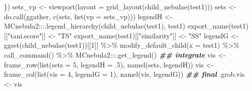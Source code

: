 \documentclass[
]{article}
\newenvironment{Shaded}{\begin{snugshade}}{\end{snugshade}}
\newcommand{\AttributeTok}[1]{\textcolor[rgb]{0.77,0.63,0.00}{#1}}
\newcommand{\DecValTok}[1]{\textcolor[rgb]{0.00,0.00,0.81}{#1}}
\newcommand{\DocumentationTok}[1]{\textcolor[rgb]{0.56,0.35,0.01}{\textbf{\textit{#1}}}}
\newcommand{\FunctionTok}[1]{\textcolor[rgb]{0.00,0.00,0.00}{#1}}
\newcommand{\NormalTok}[1]{#1}
\newcommand{\OtherTok}[1]{\textcolor[rgb]{0.56,0.35,0.01}{#1}}
\newcommand{\SpecialCharTok}[1]{\textcolor[rgb]{0.00,0.00,0.00}{#1}}
\newcommand{\StringTok}[1]{\textcolor[rgb]{0.31,0.60,0.02}{#1}}
\begin{document}
\begin{Shaded}
\begin{Highlighting}[]
\NormalTok{               \})}
\NormalTok{sets\_vp }\OtherTok{\textless{}{-}} \FunctionTok{viewport}\NormalTok{(}\AttributeTok{layout =} \FunctionTok{grid\_layout}\NormalTok{(}\FunctionTok{child\_nebulae}\NormalTok{(test1)))}
\NormalTok{sets }\OtherTok{\textless{}{-}} \FunctionTok{do.call}\NormalTok{(ggather, }\FunctionTok{c}\NormalTok{(sets, }\FunctionTok{list}\NormalTok{(}\AttributeTok{vp =}\NormalTok{ sets\_vp)))}
\NormalTok{legendH }\OtherTok{\textless{}{-}}\NormalTok{ MCnebula2}\SpecialCharTok{:::}\FunctionTok{.legend\_hierarchy}\NormalTok{(}\FunctionTok{child\_nebulae}\NormalTok{(test1), test1)}
\FunctionTok{export\_name}\NormalTok{(test1)[[}\StringTok{"tani.score"}\NormalTok{]] }\OtherTok{\textless{}{-}} \StringTok{"TS"}
\FunctionTok{export\_name}\NormalTok{(test1)[[}\StringTok{"similarity"}\NormalTok{]] }\OtherTok{\textless{}{-}} \StringTok{"SS"}
\NormalTok{legendG }\OtherTok{\textless{}{-}} \FunctionTok{ggset}\NormalTok{(}\FunctionTok{child\_nebulae}\NormalTok{(test1))[[}\DecValTok{1}\NormalTok{]] }\SpecialCharTok{\%\textgreater{}\%}
  \FunctionTok{modify\_default\_child}\NormalTok{(}\AttributeTok{x =}\NormalTok{ test1) }\SpecialCharTok{\%\textgreater{}\%}
  \FunctionTok{call\_command}\NormalTok{() }\SpecialCharTok{\%\textgreater{}\%}
\NormalTok{  MCnebula2}\SpecialCharTok{:::}\FunctionTok{.get\_legend}\NormalTok{()}
\DocumentationTok{\#\# integrate}
\NormalTok{vis }\OtherTok{\textless{}{-}} \FunctionTok{frame\_row}\NormalTok{(}\FunctionTok{list}\NormalTok{(}\AttributeTok{sets =} \DecValTok{5}\NormalTok{, }\AttributeTok{legendH =}\NormalTok{ .}\DecValTok{5}\NormalTok{), }\FunctionTok{namel}\NormalTok{(sets, legendH))}
\NormalTok{vis }\OtherTok{\textless{}{-}} \FunctionTok{frame\_col}\NormalTok{(}\FunctionTok{list}\NormalTok{(}\AttributeTok{vis =} \DecValTok{4}\NormalTok{, }\AttributeTok{legendG =} \DecValTok{1}\NormalTok{), }\FunctionTok{namel}\NormalTok{(vis, legendG))}
\DocumentationTok{\#\# final}
\NormalTok{.grob.vis }\OtherTok{\textless{}{-}}\NormalTok{ vis}


\end{Highlighting}
\end{Shaded}
\end{document}
